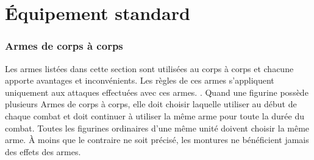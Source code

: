 
\part{Équipement standard}

\section{Armes de corps à corps}
\label{equipement/cac}

Les armes listées dans cette section sont utilisées au corps à corps et chacune apporte avantages et inconvénients. Les règles de ces armes s'appliquent uniquement aux attaques effectuées avec ces armes. . Quand une figurine possède plusieurs Armes de corps à corps, elle doit choisir laquelle utiliser au début de chaque combat et doit continuer à utiliser la même arme pour toute la durée du combat. Toutes les figurines ordinaires d'une même unité doivent choisir la même arme. À moins que le contraire ne soit précisé, les montures ne bénéficient jamais des effets des armes.

